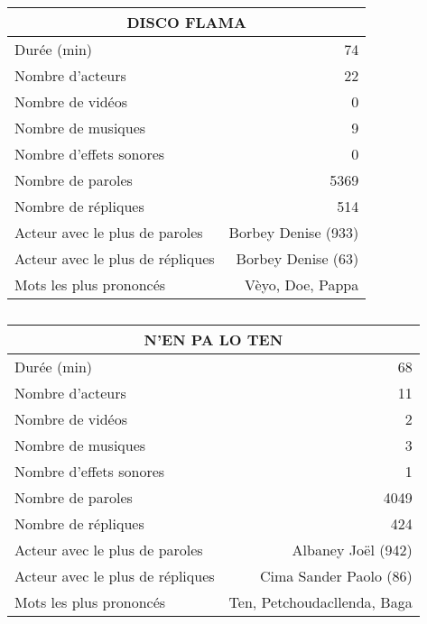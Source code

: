     \begin{table}[]
    \centering
    \caption{}
    \begin{tabular}{lr}\toprule\multicolumn{2}{c}{DISCO FLAMA} \\\midrule
\multicolumn{1}{l}{Durée (min)}&74\\
\multicolumn{1}{l}{Nombre d'acteurs}&22\\
\multicolumn{1}{l}{Nombre de vidéos}&0\\
\multicolumn{1}{l}{Nombre de musiques}&9\\
\multicolumn{1}{l}{Nombre d'effets sonores}&0\\
\multicolumn{1}{l}{Nombre de paroles}&5369\\
\multicolumn{1}{l}{Nombre de répliques}&514\\
\multicolumn{1}{l}{Acteur avec le plus de paroles}&Borbey Denise (933)\\
\multicolumn{1}{l}{Acteur avec le plus de répliques}&Borbey Denise (63)\\
\multicolumn{1}{l}{Mots les plus prononcés}&Vèyo, Doe, Pappa\\
    \bottomrule
    \end{tabular}%
    \end{table}
    \begin{table}[]
    \centering
    \caption{}
    \begin{tabular}{lr}\toprule\multicolumn{2}{c}{N'EN PA LO TEN} \\\midrule
\multicolumn{1}{l}{Durée (min)}&68\\
\multicolumn{1}{l}{Nombre d'acteurs}&11\\
\multicolumn{1}{l}{Nombre de vidéos}&2\\
\multicolumn{1}{l}{Nombre de musiques}&3\\
\multicolumn{1}{l}{Nombre d'effets sonores}&1\\
\multicolumn{1}{l}{Nombre de paroles}&4049\\
\multicolumn{1}{l}{Nombre de répliques}&424\\
\multicolumn{1}{l}{Acteur avec le plus de paroles}&Albaney Joël (942)\\
\multicolumn{1}{l}{Acteur avec le plus de répliques}&Cima Sander Paolo (86)\\
\multicolumn{1}{l}{Mots les plus prononcés}&Ten, Petchoudacllenda, Baga\\
    \bottomrule
    \end{tabular}%
    \end{table}
